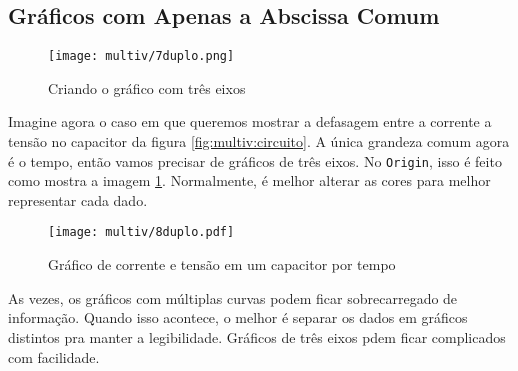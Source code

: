 \subsection{Gráficos com Apenas a Abscissa Comum}

    \begin{figure}[htbp]
        \centering
        \texttt{[image: multiv/7duplo.png]}

        \caption{Criando o gráfico com três eixos}
        \label{fig:multiv:duplo:tutorial}
    \end{figure}

    Imagine agora o caso em que queremos mostrar a defasagem entre a corrente a tensão no capacitor da figura \ref{fig:multiv:circuito}. A única grandeza comum agora é o tempo, então vamos precisar de gráficos de três eixos. No \texttt{Origin}, isso é feito como mostra a imagem \ref{fig:multiv:duplo:tutorial}. Normalmente, é melhor alterar as cores para melhor representar cada dado.

    \begin{figure}[htbp]
        \centering
        \texttt{[image: multiv/8duplo.pdf]}

        \caption{Gráfico de corrente e tensão em um capacitor por tempo}
        \label{fig:multiv:duplo}
    \end{figure}

    \begin{nota}
        As vezes, os gráficos com múltiplas curvas podem ficar sobrecarregado de informação. Quando isso acontece, o melhor é separar os dados em gráficos distintos pra manter a legibilidade. Gráficos de três eixos pdem ficar complicados com facilidade.
    \end{nota}
